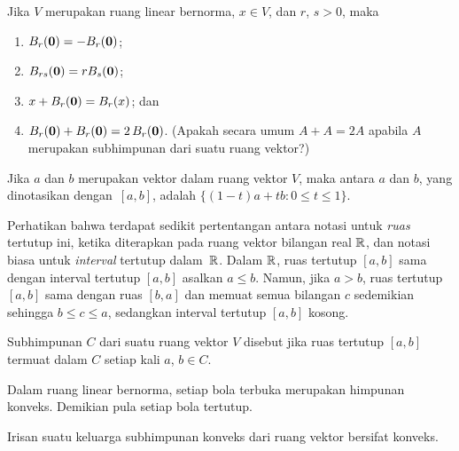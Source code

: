 \begin{prop} Jika $V$ merupakan ruang linear bernorma, $x \in V$, dan $r$, $s > 0$, maka
 \begin{enumerate}[label=\rm{(\alph*)}]
   \item $B_r(\mathbf{0}) = -B_r(\mathbf{0})$;
   \item $B_{rs}(\mathbf{0}) = rB_s(\mathbf{0})$;
   \item $x + B_r(\mathbf{0}) = B_r(x)$; dan
   \item $B_r(\mathbf{0}) + B_r(\mathbf{0}) = 2\,B_r(\mathbf{0})$. (Apakah secara umum
$A + A = 2A$ apabila $A$ merupakan subhimpunan dari suatu ruang vektor?)
 \end{enumerate}
\end{prop}

\begin{defn}\label{C017314} Jika $a$ dan $b$ merupakan vektor dalam ruang vektor $V$, maka
 antara $a$ dan $b$, yang dinotasikan
dengan~$[a,b]$, adalah $\{(1 - t)a + tb \colon 0 \le t \le 1\}$.
\end{defn}

\begin{cau}\label{C017317} Perhatikan bahwa terdapat sedikit pertentangan antara notasi
untuk \emph{ruas} tertutup ini, ketika diterapkan pada ruang vektor bilangan real $\mathbb{R}$,
dan notasi biasa untuk \emph{interval} tertutup dalam~$\mathbb{R}$. Dalam $\mathbb{R}$, ruas tertutup
$[a,b]$ sama dengan interval tertutup $[a,b]$ asalkan $a \le b$. Namun, jika $a > b$,
ruas tertutup $[a,b]$ sama dengan ruas $[b,a]$ dan memuat semua bilangan $c$ sedemikian
sehingga $b \le c \le a$, sedangkan interval tertutup $[a,b]$ kosong.
\end{cau}

\begin{defn} Subhimpunan $C$ dari suatu ruang vektor $V$ disebut
 jika ruas tertutup $[a,b]$ termuat dalam $C$ setiap kali $a$, $b \in C$.
\end{defn}

\begin{exam}\label{C023169} Dalam ruang linear bernorma, setiap bola terbuka merupakan
himpunan konveks. Demikian pula setiap bola tertutup.
\end{exam}

\begin{prop}\label{prop_intrsctn_convex} Irisan suatu keluarga subhimpunan konveks dari
ruang vektor bersifat konveks.
\end{prop}


